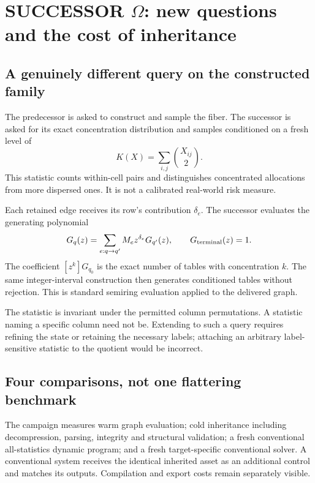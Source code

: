 \documentclass[11pt,letterpaper]{article}
\begin{document}
\section{SUCCESSOR \texorpdfstring{$\Omega$}{Omega}: new questions and the cost of inheritance}

\subsection{A genuinely different query on the constructed family}

The predecessor is asked to construct and sample the fiber. The successor is asked
for its exact concentration distribution and samples conditioned on a fresh level of
\begin{equation}
K(X)=\sum_{i,j}\binom{X_{ij}}2.
\end{equation}
This statistic counts within-cell pairs and distinguishes concentrated allocations
from more dispersed ones. It is not a calibrated real-world risk measure.

Each retained edge receives its row's contribution $\delta_e$. The successor evaluates
the generating polynomial
\begin{equation}
G_q(z)=\sum_{e:q\rightarrow q'}M_ez^{\delta_e}G_{q'}(z),
\qquad G_{\rm terminal}(z)=1.
\label{eq:polynomial}
\end{equation}
The coefficient $[z^k]G_{q_0}$ is the exact number of tables with concentration $k$.
The same integer-interval construction then generates conditioned tables without
rejection. This is standard semiring evaluation applied to the delivered graph.

The statistic is invariant under the permitted column permutations. A statistic naming
a specific column need not be. Extending to such a query requires refining the state
or retaining the necessary labels; attaching an arbitrary label-sensitive statistic
to the quotient would be incorrect.

\subsection{Four comparisons, not one flattering benchmark}

The campaign measures warm graph evaluation; cold inheritance including decompression,
parsing, integrity and structural validation; a fresh conventional all-statistics
dynamic program; and a fresh target-specific conventional solver. A conventional
system receives the identical inherited asset as an additional control and matches
its outputs. Compilation and export costs remain separately visible.
\end{document}
